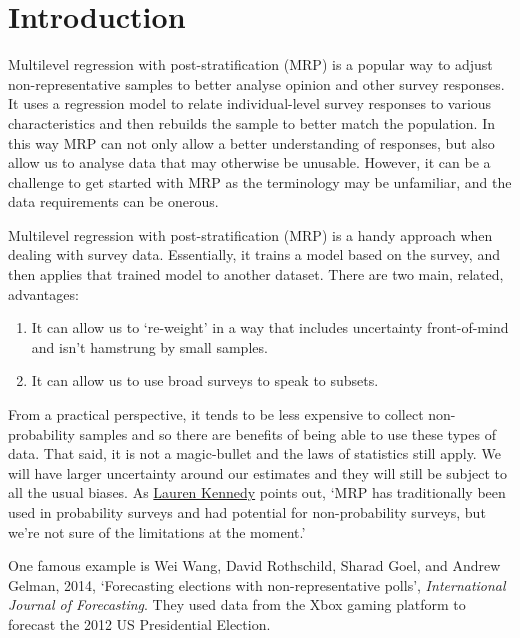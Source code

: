 \documentclass[
]{book}
\providecommand{\tightlist}{%
  \setlength{\itemsep}{0pt}\setlength{\parskip}{0pt}}
\begin{document}
\hypertarget{introduction-25}{%
\section{Introduction}\label{introduction-25}}

Multilevel regression with post-stratification (MRP) is a popular way to adjust non-representative samples to better analyse opinion and other survey responses. It uses a regression model to relate individual-level survey responses to various characteristics and then rebuilds the sample to better match the population. In this way MRP can not only allow a better understanding of responses, but also allow us to analyse data that may otherwise be unusable. However, it can be a challenge to get started with MRP as the terminology may be unfamiliar, and the data requirements can be onerous.

Multilevel regression with post-stratification (MRP) is a handy approach when dealing with survey data. Essentially, it trains a model based on the survey, and then applies that trained model to another dataset. There are two main, related, advantages:

\begin{enumerate}
\def\labelenumi{\arabic{enumi})}
\tightlist
\item
  It can allow us to `re-weight' in a way that includes uncertainty front-of-mind and isn't hamstrung by small samples.
\item
  It can allow us to use broad surveys to speak to subsets.
\end{enumerate}

From a practical perspective, it tends to be less expensive to collect non-probability samples and so there are benefits of being able to use these types of data. That said, it is not a magic-bullet and the laws of statistics still apply. We will have larger uncertainty around our estimates and they will still be subject to all the usual biases. As \href{https://twitter.com/jazzystats}{Lauren Kennedy} points out, `MRP has traditionally been used in probability surveys and had potential for non-probability surveys, but we're not sure of the limitations at the moment.'

One famous example is Wei Wang, David Rothschild, Sharad Goel, and Andrew Gelman, 2014, `Forecasting elections with non-representative polls', \emph{International Journal of Forecasting}. They used data from the Xbox gaming platform to forecast the 2012 US Presidential Election.
\end{document}

